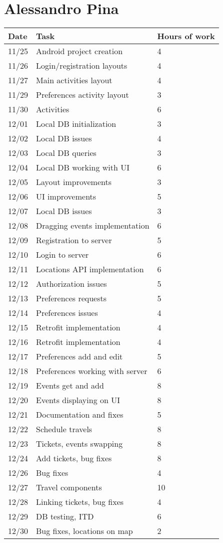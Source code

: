 \section{Alessandro Pina}
\begin{table}[H]
	\begin{tabular}{ p{2cm} p{10cm} p{3cm}}
	Date & Task & Hours of work\\
	\hline
	11/25 & Android project creation & 4 \\
	11/26 & Login/registration layouts & 4 \\
	11/27 & Main activities layout & 4 \\
	11/29 & Preferences activity layout & 3 \\
	11/30 & Activities & 6 \\
	12/01 & Local DB initialization & 3 \\
	12/02 & Local DB issues & 4 \\
	12/03 & Local DB queries & 3 \\
	12/04 & Local DB working with UI & 6 \\
	12/05 & Layout improvements & 3 \\
	12/06 & UI improvements & 5 \\
	12/07 & Local DB issues & 3 \\
	12/08 & Dragging events implementation & 6 \\
	12/09 & Registration to server & 5 \\
	12/10 & Login to server & 6 \\
	12/11 & Locations API implementation & 6 \\
	12/12 & Authorization issues & 5 \\
	12/13 & Preferences requests & 5 \\
	12/14 & Preferences issues & 4 \\
	12/15 & Retrofit implementation & 4 \\
	12/16 & Retrofit implementation & 4 \\
	12/17 & Preferences add and edit & 5 \\
	12/18 & Preferences working with server & 6 \\
	12/19 & Events get and add & 8 \\
	12/20 & Events displaying on UI & 8 \\
	12/21 & Documentation and fixes & 5 \\
	12/22 & Schedule travels & 8 \\
	12/23 & Tickets, events swapping & 8 \\
	12/24 & Add tickets, bug fixes & 8 \\
	12/26 & Bug fixes & 4 \\
	12/27 & Travel components & 10 \\
	12/28 & Linking tickets, bug fixes & 4 \\
	12/29 & DB testing, ITD & 6 \\
	12/30 & Bug fixes, locations on map & 2 \\
	\end{tabular}
\end{table}

